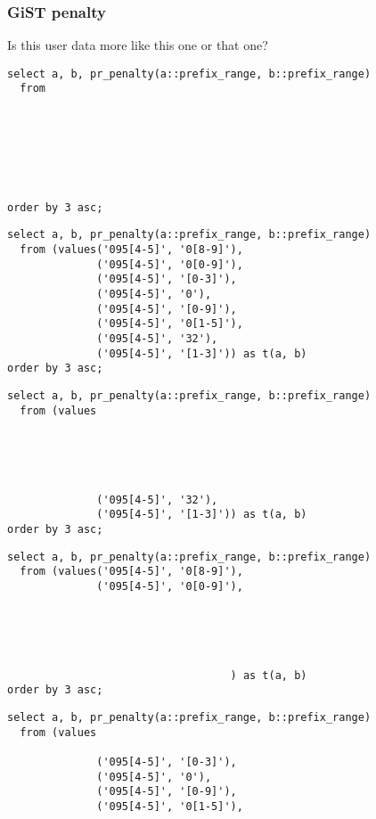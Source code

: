 \documentclass{beamer}
\begin{document}
\begin{frame}[fragile]
  \frametitle{GiST penalty}

  Is this user data more like this one or that one?

  \begin{example}
  \begin{overprint}

  \begin{verbatim}
select a, b, pr_penalty(a::prefix_range, b::prefix_range)
  from
      
      
      
      
      
      
      
order by 3 asc;
  \end{verbatim}

  \begin{verbatim}
select a, b, pr_penalty(a::prefix_range, b::prefix_range)
  from (values('095[4-5]', '0[8-9]'),
              ('095[4-5]', '0[0-9]'),
              ('095[4-5]', '[0-3]'),
              ('095[4-5]', '0'),
              ('095[4-5]', '[0-9]'),
              ('095[4-5]', '0[1-5]'),
              ('095[4-5]', '32'),
              ('095[4-5]', '[1-3]')) as t(a, b)
order by 3 asc;
  \end{verbatim}

  \begin{verbatim}
select a, b, pr_penalty(a::prefix_range, b::prefix_range)
  from (values





              ('095[4-5]', '32'),
              ('095[4-5]', '[1-3]')) as t(a, b)
order by 3 asc;
  \end{verbatim}

  \begin{verbatim}
select a, b, pr_penalty(a::prefix_range, b::prefix_range)
  from (values('095[4-5]', '0[8-9]'),
              ('095[4-5]', '0[0-9]'),





                                   ) as t(a, b)
order by 3 asc;
  \end{verbatim}

  \begin{verbatim}
select a, b, pr_penalty(a::prefix_range, b::prefix_range)
  from (values
              
              ('095[4-5]', '[0-3]'),
              ('095[4-5]', '0'),
              ('095[4-5]', '[0-9]'),
              ('095[4-5]', '0[1-5]'),
              

\end{verbatim}
\end{overprint}
\end{example}
\end{frame}
\end{document}
